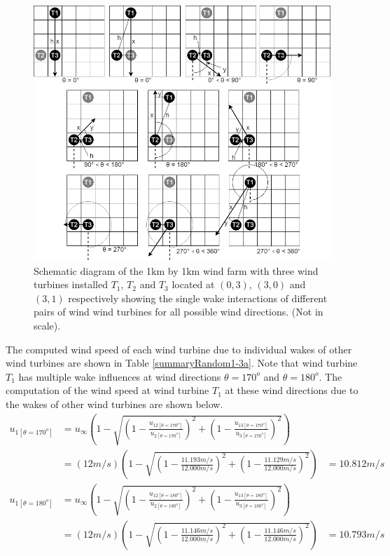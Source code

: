    \begin{figure}[H]
        \centering
        \includegraphics[width=\textwidth]{Figures/013031.png}
        \caption{Schematic diagram of the 1km by 1km wind farm with three wind turbines installed $T_1$, $T_2$ and $T_3$ located at $(0,3)$, $(3,0)$ and $(3,1)$ respectively showing the single wake interactions of different pairs of wind wind turbines for all possible wind directions. (Not in scale).}
        \label{013031}
    \end{figure}
    
    The computed wind speed of each wind turbine due to individual wakes of other wind turbines are shown in Table \ref{summaryRandom1-3a}. Note that wind turbine $T_1$ has multiple wake influences at wind directions $\theta=170^o$ and $\theta=180^o$. The computation of the wind speed at wind turbine $T_1$ at these wind directions due to the wakes of other wind turbines are shown below.
    \begin{align*}
	    u_{1[\theta=170^o]} &= u_\infty\left( 1-\sqrt{\left( 1-\frac{u_{12[\theta=170^o]}}{u_{2[\theta=170^o]}} \right)^2 + \left( 1-\frac{u_{13[\theta=170^o]}}{u_{3[\theta=170^o]}} \right)^2} \right) \\
	    &= (12m/s)\left( 1-\sqrt{\left( 1-\frac{11.193m/s}{12.000m/s} \right)^2 + \left( 1-\frac{11.129m/s}{12.000m/s} \right)^2} \right)
	    &=10.812m/s
	\end{align*}
	\begin{align*}
	    u_{1[\theta=180^o]} &= u_\infty\left( 1-\sqrt{\left( 1-\frac{u_{12[\theta=180^o]}}{u_{2[\theta=180^o]}} \right)^2 + \left( 1-\frac{u_{13[\theta=180^o]}}{u_{3[\theta=180^o]}} \right)^2} \right) \\
	    &= (12m/s)\left( 1-\sqrt{\left( 1-\frac{11.146m/s}{12.000m/s} \right)^2 + \left( 1-\frac{11.146m/s}{12.000m/s} \right)^2} \right)
	    &=10.793m/s
	\end{align*}
	

